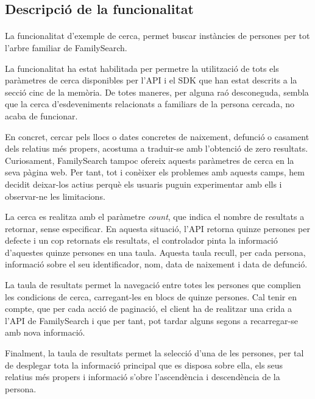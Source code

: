 \subsection{Descripció de la funcionalitat}

    \paragraph{}
    La funcionalitat d'exemple de cerca, permet buscar instàncies de persones per tot l'arbre familiar de FamilySearch.

    La funcionalitat ha estat habilitada per permetre la utilització de tots els paràmetres de cerca disponibles per l'API i el SDK que han estat descrits a la secció cinc de la memòria. De totes maneres, per alguna raó desconeguda, sembla que la cerca d'esdeveniments relacionats a familiars de la persona cercada, no acaba de funcionar.

    En concret, cercar pels llocs o dates concretes de naixement, defunció o casament dels relatius més propers, acostuma a traduir-se amb l'obtenció de zero resultats. Curiosament, FamilySearch tampoc ofereix aquests paràmetres de cerca en la seva pàgina web. Per tant, tot i conèixer els problemes amb aquests camps, hem decidit deixar-los actius perquè els usuaris puguin experimentar amb ells i observar-ne les limitacions.

    La cerca es realitza amb el paràmetre \emph{count}, que indica el nombre de resultats a retornar, sense especificar. En aquesta situació, l'API retorna quinze persones per defecte i un cop retornats els resultats, el controlador pinta la informació d'aquestes quinze persones en una taula. Aquesta taula recull, per cada persona, informació sobre el seu identificador, nom, data de naixement i data de defunció.

    La taula de resultats permet la navegació entre totes les persones que complien les condicions de cerca, carregant-les en blocs de quinze persones. Cal tenir en compte, que per cada acció de paginació, el client ha de realitzar una crida a l'API de FamilySearch i que per tant, pot tardar alguns segons a recarregar-se amb nova informació.

    Finalment, la taula de resultats permet la selecció d'una de les persones, per tal de desplegar tota la informació principal que es disposa sobre ella, els seus relatius més propers i informació s'obre l'ascendència i descendència de la persona.
